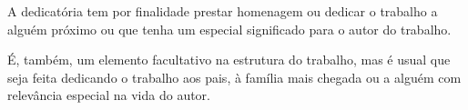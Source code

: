



\frontmatter %

\pagestyle{plain} %

\maketitlepage


\makeconttitlepage







\begin{dedicatory}
\null \vfill
\begin{flushright}

A dedicatória tem por finalidade prestar homenagem ou dedicar o trabalho a alguém próximo ou que tenha um especial significado para o autor do trabalho. 

É, também, um elemento facultativo na estrutura do trabalho, mas é usual que seja feita dedicando o trabalho aos pais, à família mais chegada ou a alguém com relevância especial na vida do autor. 

\end{flushright}
\vfill \null%
\end{dedicatory}


